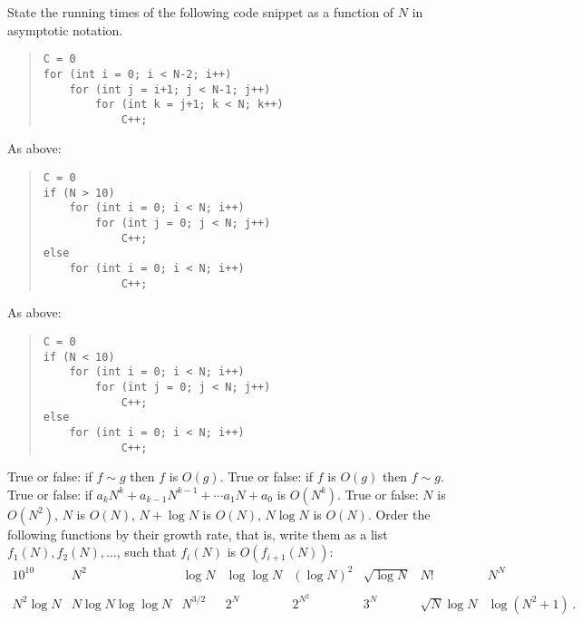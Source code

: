 \documentclass[a4paper,nobib]{tufte-handout}
\begin{document}
\begin{ExerciseList}
  \Exercise State the running times of the following code snippet as
  a function of $N$ in asymptotic notation.
  \begin{quote}
\begin{lstlisting}[basicstyle=\ttfamily\small]
C = 0
for (int i = 0; i < N-2; i++)
    for (int j = i+1; j < N-1; j++)
        for (int k = j+1; k < N; k++)
            C++;
\end{lstlisting}
\end{quote} 

  \Exercise As above:
  \begin{quote}
\begin{lstlisting}[basicstyle=\ttfamily\small]
C = 0
if (N > 10)
    for (int i = 0; i < N; i++)
        for (int j = 0; j < N; j++)
            C++;
else 
    for (int i = 0; i < N; i++)
            C++;
\end{lstlisting}
\end{quote} 

  \Exercise As above:
  \begin{quote}
\begin{lstlisting}[basicstyle=\ttfamily\small]
C = 0
if (N < 10)
    for (int i = 0; i < N; i++)
        for (int j = 0; j < N; j++)
            C++;
else 
    for (int i = 0; i < N; i++)
            C++;
\end{lstlisting}
\end{quote} 

\Exercise True or false: if $f\sim g$ then $f$ is $O(g)$.
\Exercise True or false: if $f$ is $O(g)$ then $f\sim g$.
\Exercise True or false: if $a_kN^k +a_{k-1}N^{k-1} + \cdots a_1 N +
a_0$ is $O(N^k)$.
\Exercise True or false: $N$ is $O(N^2)$, $N$ is $O(N)$, $N+\log
N $ is $O(N)$, $N\log N $ is $O(N)$.
\Exercise Order the following functions by their growth rate, that is,
write them as a list $f_1(N),f_2(N),\ldots$, such that $f_i(N)$ is $O(f_{i+1}(N))$:
    \begin{equation*}
      \begin{array}{cccccccc}
      10^{10}& N^2& \log N& \log\log N& (\log N)^2& \sqrt{\log N}& N!&
      N^N \\
      \\
      N^2\log N& N\log N\log\log N& N^{3/2}& 2^N& 2^{N^2}& 3^N& \sqrt{N}\log N &\log (N^2+1)\,.
      \end{array}
      \end{equation*}
\end{ExerciseList}
\end{document}
